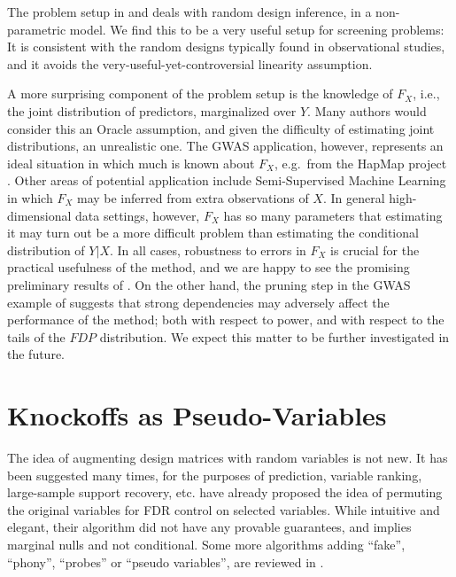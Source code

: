 \documentclass[article,lineno]{biometrika}
\begin{document}
	The problem setup in \cite{CandesPanninggoldmodelX2018} and \cite{SesiaGenehuntinghidden} deals with random design inference, in a non-parametric model.
	We find this to be a very useful setup for screening problems:
	It is consistent with the random designs typically found in observational studies, and it avoids the very-useful-yet-controversial linearity assumption.
	
	A more surprising component of the problem setup is the knowledge of $F_X$, i.e., the joint distribution of predictors, marginalized over $Y$.
	Many authors would consider this an Oracle assumption, and given the difficulty of estimating joint distributions, an unrealistic one.
	The GWAS application, however, represents an ideal situation in which much is known about $F_X$, e.g.\ from the HapMap project \citep{Hapmap2003}.
	Other areas of potential application include Semi-Supervised Machine Learning in which $F_X$ may be inferred from extra observations of $X$.
	In general high-dimensional data settings, however, $F_X$ has so many parameters that estimating it may turn out be a more difficult problem than estimating the conditional distribution of $Y|X$.
	In all cases, robustness to errors in $F_X$ is crucial for the practical usefulness of the method, and we are happy to see the promising preliminary results of \cite{CandesPanninggoldmodelX2018}.
	On the other hand, the pruning step in the GWAS example of \cite{SesiaGenehuntinghidden} suggests that strong dependencies may adversely affect the performance of the method; both with respect to power, and with respect to the tails of the $FDP$ distribution.
	We expect this matter to be further investigated in the future.
	
	
	
	
	\section{Knockoffs as Pseudo-Variables}
	The idea of augmenting design matrices with random variables is not new.
	It has been suggested many times, for the purposes of prediction, variable ranking, large-sample support recovery, etc.
	\cite{TusherSignificanceanalysismicroarrays2001} have already proposed the idea of permuting the original variables for \rm{FDR} control on selected variables.
	While intuitive and elegant, their algorithm did not have any provable guarantees, and implies marginal nulls and not conditional.
	Some more algorithms adding ``fake'', ``phony'', ``probes'' or ``pseudo variables'', are reviewed in \cite{GuyonIntroductionVariableFeature2003}.
	
\end{document}
